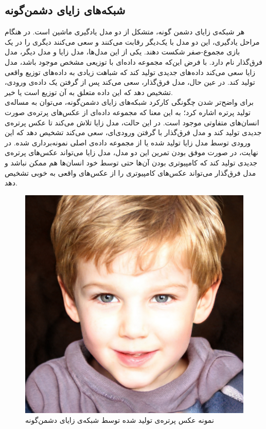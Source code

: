 \subsection{
شبکه‌های زایای دشمن‌گونه
\protect{}
}
هر شبکه‌ی زایای دشمن گونه، متشکل از دو مدل یادگیری ماشین است. در هنگام مراحل یادگیری، این دو مدل با یک‌دیگر رقابت می‌کنند و سعی می‌کنند دیگری را در یک بازی مجموع-صفر
شکست دهند. یکی از این مدل‌ها، مدل زایا
و مدل دیگر، مدل فرق‌گذار
نام دارد. 
با فرض این‌که مجموعه داده‌ای با توزیعی
مشخص موجود باشد، مدل زایا سعی می‌کند داده‌های جدیدی تولید کند که شباهت زیادی به داده‌های توزیع واقعی تولید کند. در عین حال، مدل فرق‌گذار، سعی می‌کند پس از گرفتن یک داده‌ی ورودی، تشخیص دهد که این داده متعلق به آن توزیع است یا خیر.
\\
برای واضح‌تر شدن چگونگی کارکرد شبکه‌های زایای دشمن‌گونه، می‌توان به مساله‌ی تولید پرتره اشاره کرد؛ به این معنا که مجموعه داده‌ای از عکس‌های پرتره‌ی صورت انسان‌های متفاوتی موجود است. در این حالت، مدل زایا تلاش می‌کند تا عکس پرتره‌ی جدیدی تولید کند و مدل فرق‌گذار با گرفتن ورودی‌ای، سعی می‌کند تشخیص دهد که این ورودی توسط مدل زایا تولید شده یا از مجموعه داده‌ی اصلی نمونه‌برداری شده.
در نهایت، در صورت موفق بودن تمرین این دو مدل، مدل زایا می‌تواند عکس‌های پرتره‌ی جدیدی تولید کند که کامپیوتری بودن آن‌ها حتی توسط خود انسان‌ها هم ممکن نباشد و مدل فرق‌گذار می‌تواند عکس‌های کامپیوتری را از عکس‌های واقعی به خوبی تشخیص دهد. 

\begin{figure}
	\centering
	\includegraphics[scale=0.2]{figures/fakeperson.jpg}
	\caption [
	نمونه عکس پرتره‌ی تولید شده توسط شبکه‌ی زایای دشمن‌گونه
	]{
	نمونه عکس پرتره‌ی تولید شده توسط شبکه‌ی زایای دشمن‌گونه
	\cite{thisperson}
	}
	\label{fig:lstmblock}
\end{figure}
